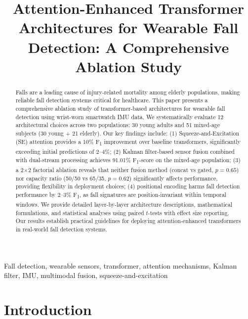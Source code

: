 \documentclass[journal,12pt]{IEEEtran}
\title{Attention-Enhanced Transformer Architectures for Wearable Fall Detection: A Comprehensive Ablation Study}
\author{
    \IEEEauthorblockN{Author Name\IEEEauthorrefmark{1}}
    \IEEEauthorblockA{\IEEEauthorrefmark{1}Department of Computer Science\\
    Texas State University\\
    San Marcos, TX, USA\\
    email@txstate.edu}
}
\newcommand{\fone}{F\textsubscript{1}}
\begin{document}
\maketitle


\begin{abstract}
Falls are a leading cause of injury-related mortality among elderly populations, making reliable fall detection systems critical for healthcare. This paper presents a comprehensive ablation study of transformer-based architectures for wearable fall detection using wrist-worn smartwatch IMU data. We systematically evaluate 12 architectural choices across two populations: 30 young adults and 51 mixed-age subjects (30 young + 21 elderly). Our key findings include: (1) Squeeze-and-Excitation (SE) attention provides a 10\% \fone{} improvement over baseline transformers, significantly exceeding initial predictions of 2--4\%; (2) Kalman filter-based sensor fusion combined with dual-stream processing achieves 91.01\% \fone{}-score on the mixed-age population; (3) a 2$\times$2 factorial ablation reveals that neither fusion method (concat vs gated, $p=0.65$) nor capacity ratio (50/50 vs 65/35, $p=0.62$) significantly affects performance, providing flexibility in deployment choices; (4) positional encoding harms fall detection performance by 2--3\% \fone{}, as fall signatures are position-invariant within temporal windows. We provide detailed layer-by-layer architecture descriptions, mathematical formulations, and statistical analyses using paired $t$-tests with effect size reporting. Our results establish practical guidelines for deploying attention-enhanced transformers in real-world fall detection systems.
\end{abstract}

\begin{IEEEkeywords}
Fall detection, wearable sensors, transformer, attention mechanisms, Kalman filter, IMU, multimodal fusion, squeeze-and-excitation
\end{IEEEkeywords}


\section{Introduction}
\label{sec:introduction}
\end{document}

